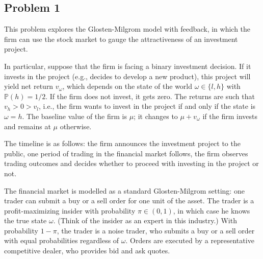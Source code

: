 \ifreexam


\subsection*{Problem 1}
	This problem explores the Glosten-Milgrom model with feedback, in which the firm can use the stock market to gauge the attractiveness of an investment project.
	
	In particular, suppose that the firm is facing a binary investment decision. If it invests in the project (e.g., decides to develop a new product), this project will yield net return $v_\omega$, which depends on the state of the world $\omega \in \{l,h\}$ with $\mathbb{P}(h)=1/2$. If the firm does not invest, it gets zero. The returns are such that $v_h > 0 > v_l$, i.e., the firm wants to invest in the project if and only if the state is $\omega=h$. The baseline value of the firm is $\mu$; it changes to $\mu + v_\omega$ if the firm invests and remains at $\mu$ otherwise.
	
	The timeline is as follows: the firm announces the investment project to the public, one period of trading in the financial market follows, the firm observes trading outcomes and decides whether to proceed with investing in the project or not.
	
	The financial market is modelled as a standard Glosten-Milgrom setting: one trader can submit a buy or a sell order for one unit of the asset. The trader is a profit-maximizing insider with probability $\pi \in (0,1)$, in which case he knows the true state $\omega$. (Think of the insider as an expert in this industry.) With probability $1-\pi$, the trader is a noise trader, who submits a buy or a sell order with equal probabilities regardless of $\omega$. Orders are executed by a representative competitive dealer, who provides bid and ask quotes.

